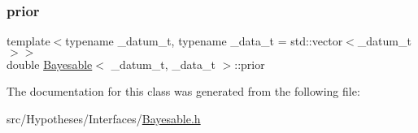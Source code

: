 \mbox{\label{class_bayesable_a473790922c2dd73e227350d029d73003}} 
\subsubsection{\texorpdfstring{prior}{prior}}
{\footnotesize\ttfamily template$<$typename \+\_\+datum\+\_\+t, typename \+\_\+data\+\_\+t = std\+::vector$<$\+\_\+datum\+\_\+t$>$$>$ \\
double \hyperlink{class_bayesable}{Bayesable}$<$ \+\_\+datum\+\_\+t, \+\_\+data\+\_\+t $>$\+::prior}



The documentation for this class was generated from the following file\+:\begin{DoxyCompactItemize}
\item 
src/\+Hypotheses/\+Interfaces/\hyperlink{_bayesable_8h}{Bayesable.\+h}\end{DoxyCompactItemize}
